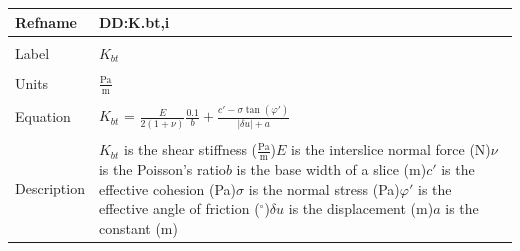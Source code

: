 \documentclass[12pt]{article}
\begin{document}
\noindent \begin{minipage}{\textwidth}
\begin{tabular}{p{} p{}}
\toprule \textbf{Refname} & \textbf{DD:K.bt,i}
\label{DD:K.bt,i}
\\ \midrule \\
Label & $K_{bt}$
\\ \midrule \\
Units & $\frac{\text{Pa}}{\text{m}}$
\\ \midrule \\
Equation & $K_{bt}$ = $\frac{E}{2\left(1+\nu{}\right)}\frac{0.1}{b}+\frac{c'-\sigma{}\tan\left(\varphi{}'\right)}{|\delta{}u|+a}$
\\ \midrule \\
Description & $K_{bt}$ is the shear stiffness ($\frac{\text{Pa}}{\text{m}}$)\newline$E$ is the interslice normal force (N)\newline$\nu{}$ is the Poisson's ratio\newline$b$ is the base width of a slice (m)\newline$c'$ is the effective cohesion (Pa)\newline$\sigma{}$ is the normal stress (Pa)\newline$\varphi{}'$ is the effective angle of friction (${}^{\circ}$)\newline$\delta{}u$ is the displacement (m)\newline$a$ is the constant (m)
\\ \bottomrule \end{tabular}
\end{minipage}\\
~\newline
\end{document}
